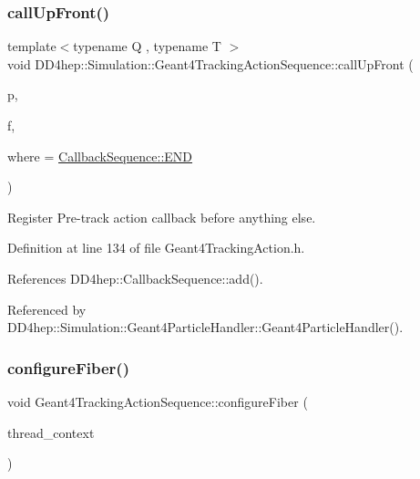 \subsubsection{\texorpdfstring{call\+Up\+Front()}{callUpFront()}}
{\footnotesize\ttfamily template$<$typename Q , typename T $>$ \\
void D\+D4hep\+::\+Simulation\+::\+Geant4\+Tracking\+Action\+Sequence\+::call\+Up\+Front (\begin{DoxyParamCaption}\item[{Q $\ast$}]{p,  }\item[{void(T\+::$\ast$)(const G4\+Track $\ast$)}]{f,  }\item[{\hyperlink{struct_d_d4hep_1_1_callback_sequence_a7753490247479633aed16a2376821ef7}{Callback\+Sequence\+::\+Location}}]{where = {\ttfamily \hyperlink{struct_d_d4hep_1_1_callback_sequence_a7753490247479633aed16a2376821ef7ac39eeb1bcfc1c235ab1d0d9315c310ac}{Callback\+Sequence\+::\+E\+ND}} }\end{DoxyParamCaption})\hspace{0.3cm}{\ttfamily [inline]}}



Register Pre-\/track action callback before anything else. 



Definition at line 134 of file Geant4\+Tracking\+Action.\+h.



References D\+D4hep\+::\+Callback\+Sequence\+::add().



Referenced by D\+D4hep\+::\+Simulation\+::\+Geant4\+Particle\+Handler\+::\+Geant4\+Particle\+Handler().

\hypertarget{class_d_d4hep_1_1_simulation_1_1_geant4_tracking_action_sequence_afff6a1aeeb049c8ee0ee2819d54b65d0}{}\label{class_d_d4hep_1_1_simulation_1_1_geant4_tracking_action_sequence_afff6a1aeeb049c8ee0ee2819d54b65d0} 
\subsubsection{\texorpdfstring{configure\+Fiber()}{configureFiber()}}
{\footnotesize\ttfamily void Geant4\+Tracking\+Action\+Sequence\+::configure\+Fiber (\begin{DoxyParamCaption}\item[{\hyperlink{class_d_d4hep_1_1_simulation_1_1_geant4_context}{Geant4\+Context} $\ast$}]{thread\+\_\+context }\end{DoxyParamCaption})\hspace{0.3cm}{\ttfamily [virtual]}}



